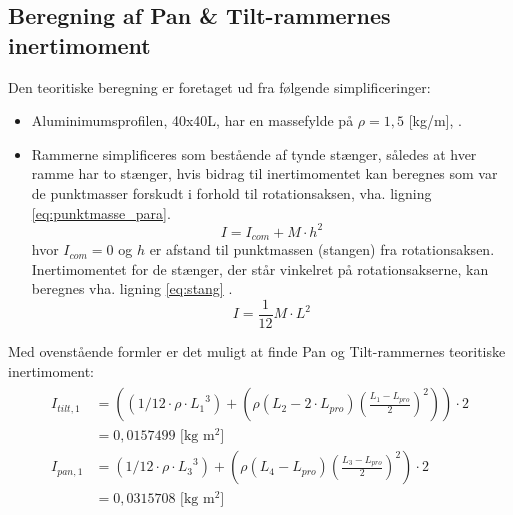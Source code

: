 \subsection{Beregning af Pan \& Tilt-rammernes inertimoment}
Den teoritiske beregning er foretaget ud fra følgende simplificeringer:
\begin{itemize}
\item Aluminimumsprofilen, 40x40L, har en massefylde på \(\rho=1,5\) [kg/m], \citep[Kap. 2 side. 4]{alu_profil_desitet}.
\item Rammerne simplificeres som bestående af tynde stænger, således at hver ramme har to stænger, hvis bidrag
til inertimomentet kan beregnes som var de punktmasser forskudt i forhold til rotationsaksen\citep[Side. 254, ligning 10-36]{fund_of_physics},
vha. ligning \ref{eq:punktmasse_para}.
\begin{equation}
I={ I }_{ com }+M\cdot { h }^{ 2 }
\label{eq:punktmasse_para} 
\end{equation}
hvor \({I_{com}} = 0\) og \(h\) er afstand til punktmassen (stangen) fra rotationsaksen.
Inertimomentet for de stænger, der står vinkelret på rotationsakserne, kan beregnes vha. ligning \ref{eq:stang}
\citep[Side. 255, tabel 10-2e]{fund_of_physics}.
\begin{equation}
I=\frac { 1 }{ 12 } M\cdot { L }^{ 2 }
\label{eq:stang} 
\end{equation}
\end{itemize}

Med ovenstående formler er det muligt at finde Pan og Tilt-rammernes teoritiske inertimoment:
\begin{align}
\label{eq:inerti_tilt_pan}
\begin{split}
{ I }_{ tilt,1 } &= \left( \left( 1/12\cdot \rho \cdot { {L_{1}} }^{ 3 } \right) +\left( \rho \left( {L_{2}}-2\cdot {L_{pro}} \right) { \left( \frac { {L_{1}}-{L_{pro}}}{ 2 }  \right)  }^{ 2 } \right)  \right) \cdot 2
\\
 &= 0,0157499 \text{ [kg m$^2$]}
\\
{ I }_{ pan,1 }&=\left( 1/12\cdot \rho \cdot { { L }_{ 3 } }^{ 3 } \right) +\left( \rho \left( { L }_{ 4 }-{ L }_{ pro } \right) { \left( \frac { { L }_{ 3 }-{ L }_{ pro } }{ 2 }  \right)  }^{ 2 } \right) \cdot 2
\\
 &=0,0315708 \text{ [kg m$^2$]}
\end{split}
\end{align}


